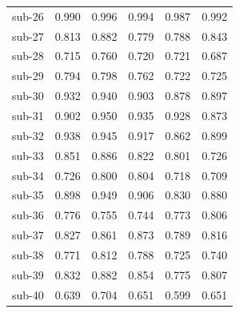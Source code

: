 \begin{table}[t]
\begin{tabular}{lccccc}
sub-26 & 0.990 & 0.996 & 0.994 & 0.987 & 0.992 \\
sub-27 & 0.813 & 0.882 & 0.779 & 0.788 & 0.843 \\
sub-28 & 0.715 & 0.760 & 0.720 & 0.721 & 0.687 \\
sub-29 & 0.794 & 0.798 & 0.762 & 0.722 & 0.725 \\
sub-30 & 0.932 & 0.940 & 0.903 & 0.878 & 0.897 \\
sub-31 & 0.902 & 0.950 & 0.935 & 0.928 & 0.873 \\
sub-32 & 0.938 & 0.945 & 0.917 & 0.862 & 0.899 \\
sub-33 & 0.851 & 0.886 & 0.822 & 0.801 & 0.726 \\
sub-34 & 0.726 & 0.800 & 0.804 & 0.718 & 0.709 \\
sub-35 & 0.898 & 0.949 & 0.906 & 0.830 & 0.880 \\
sub-36 & 0.776 & 0.755 & 0.744 & 0.773 & 0.806 \\
sub-37 & 0.827 & 0.861 & 0.873 & 0.789 & 0.816 \\
sub-38 & 0.771 & 0.812 & 0.788 & 0.725 & 0.740 \\
sub-39 & 0.832 & 0.882 & 0.854 & 0.775 & 0.807 \\
sub-40 & 0.639 & 0.704 & 0.651 & 0.599 & 0.651 \\
\bottomrule
\end{tabular}
\end{table}

